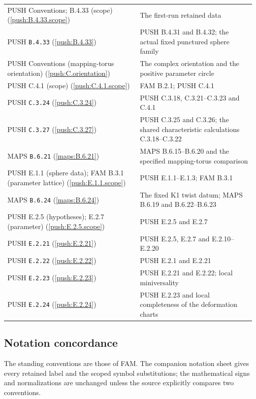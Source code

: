 \begin{longtable}{@{}L{.21\linewidth}L{.73\linewidth}@{}}
PUSH Conventions; B.4.33 (scope) (\ref{push:B.4.33.scope}) & The first-run retained data\\
PUSH \nolinkurl{B.4.33} (\ref{push:B.4.33}) & PUSH B.4.31 and B.4.32; the actual fixed punctured sphere family\\
PUSH Conventions (mapping-torus orientation) (\ref{push:C.orientation}) & The complex orientation and the positive parameter circle\\
PUSH C.4.1 (scope) (\ref{push:C.4.1.scope}) & FAM B.2.1; PUSH C.4.1\\
PUSH \nolinkurl{C.3.24} (\ref{push:C.3.24}) & PUSH C.3.18, C.3.21--C.3.23 and C.4.1\\
PUSH \nolinkurl{C.3.27} (\ref{push:C.3.27}) & PUSH C.3.25 and C.3.26; the shared characteristic calculations C.3.18--C.3.22\\
MAPS \nolinkurl{B.6.21} (\ref{maps:B.6.21}) & MAPS B.6.15--B.6.20 and the specified mapping-torus comparison\\
PUSH E.1.1 (sphere data); FAM B.3.1 (parameter lattice) (\ref{push:E.1.1.scope}) & PUSH E.1.1--E.1.3; FAM B.3.1\\
MAPS \nolinkurl{B.6.24} (\ref{maps:B.6.24}) & The fixed K1 twist datum; MAPS B.6.19 and B.6.22--B.6.23\\
PUSH E.2.5 (hypotheses); E.2.7 (parameter) (\ref{push:E.2.5.scope}) & PUSH E.2.5 and E.2.7\\
PUSH \nolinkurl{E.2.21} (\ref{push:E.2.21}) & PUSH E.2.5, E.2.7 and E.2.10--E.2.20\\
PUSH \nolinkurl{E.2.22} (\ref{push:E.2.22}) & PUSH E.2.1 and E.2.21\\
PUSH \nolinkurl{E.2.23} (\ref{push:E.2.23}) & PUSH E.2.21 and E.2.22; local miniversality\\
PUSH \nolinkurl{E.2.24} (\ref{push:E.2.24}) & PUSH E.2.23 and local completeness of the deformation charts\\
\bottomrule\end{longtable}\endgroup
\subsection{Notation concordance}\label{app:notation}
The standing conventions are those of FAM. The companion notation sheet gives every retained label and the scoped symbol substitutions; the mathematical signs and normalizations are unchanged unless the source explicitly compares two conventions.
